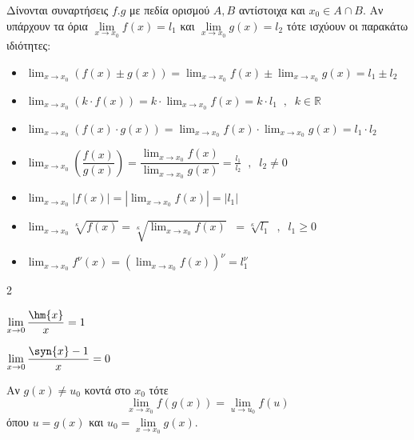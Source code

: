 Δίνονται συναρτήσεις $f.g$ με πεδία ορισμού $A,B$ αντίστοιχα και $x_0\in A\cap B$. Αν υπάρχουν τα όρια $\lim\limits_{x\to x_0}{f(x)}=l_1$ και $\lim\limits_{x\to x_0}{g(x)}=l_2$ τότε ισχύουν οι παρακάτω ιδιότητες:
\begin{itemize}
\item  $ \displaystyle{\lim_{x\rightarrow x_0}\left( f(x)\pm g(x)\right)=\displaystyle{\lim_{x\rightarrow x_0}f(x)}\pm\displaystyle{\lim_{x\rightarrow x_0}g(x)}}=l_1\pm l_2 $
\item $ \displaystyle{\lim_{x\rightarrow x_0}\left( k\cdot f(x)\right) }=k\cdot\displaystyle{\lim_{x\rightarrow x_0}f(x)}=k\cdot l_1\;\;,\;\; k\in\mathbb{R} $ 
\item $ \displaystyle{\lim_{x\rightarrow x_0}\left( f(x)\cdot g(x)\right)=\displaystyle{\lim_{x\rightarrow x_0}f(x)}\cdot\displaystyle{\lim_{x\rightarrow x_0}g(x)}}=l_1\cdot l_2 $
\item $ \displaystyle{\lim_{x\rightarrow x_0}\left(\dfrac{ f(x)} {g(x)}\right)=\dfrac{\displaystyle{\lim_{x\rightarrow x_0}f(x)}}{\displaystyle{\lim_{x\rightarrow x_0}g(x)}}}=\frac{l_1}{l_2}\;\;,\;\;l_2\neq0 $
\item $ \displaystyle{\lim_{x\rightarrow x_0}|f(x)|}=\left| \displaystyle{\lim_{x\rightarrow x_0}f(x)}\right|=|l_1|  $ 
\item $ \displaystyle{\lim_{x\rightarrow x_0}\!\!\sqrt[\kappa]{f(x)}}=\!\sqrt[\kappa]{\displaystyle{\lim_{x\rightarrow x_0}f(x)}}\;\;=\!\!\sqrt[\kappa]{l_1}\;\;,\;\;l_1\geq0 $ 
\item $ \displaystyle{\lim_{x\rightarrow x_0}f^\nu(x)}=\left( \displaystyle{\lim_{x\rightarrow x_0}f(x)}\right)^\nu=l_1^\nu  $
\end{itemize}
\vspace{-5mm}
\begin{multicols}{2}
\begin{alist}
\item $\lim\limits_{x\to 0}{\dfrac{\hm{x}}{x}}=1$
\item $\lim\limits_{x\to 0}{\dfrac{\syn{x}-1}{x}}=0$
\end{alist}
\end{multicols}

Αν $g(x)\neq u_0$ κοντά στο $x_0$ τότε
\[\lim\limits_{x\to x_0}{f(g(x))}=\lim\limits_{u\to u_0}{f(u)}\]
όπου $u=g(x)$ και $u_0=\lim\limits_{x\to x_0}{g(x)}$.


